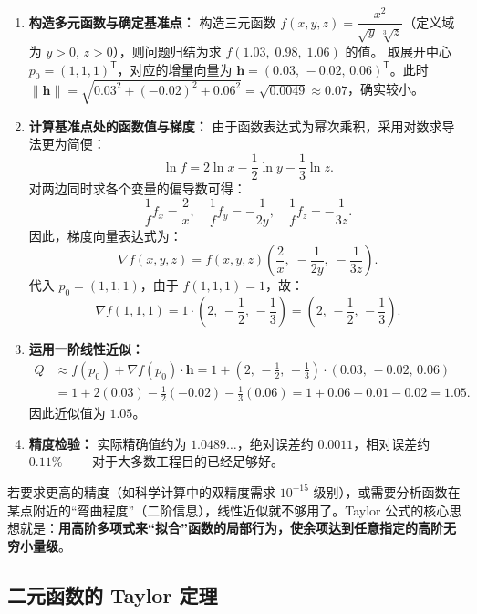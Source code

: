 \documentclass[lang=cn,11pt]{elegantbook}
\begin{document}
\begin{solution}
\begin{enumerate}
  \item \textbf{构造多元函数与确定基准点：}
  构造三元函数 $f(x,y,z)=\dfrac{x^2}{\sqrt{y}\,\sqrt[3]{z}}$（定义域为 $y>0$, $z>0$），则问题归结为求 $f(1.03,\;0.98,\;1.06)$ 的值。
  取展开中心 $p_0=(1,1,1)^{\mathsf T}$，对应的增量向量为 $\boldsymbol h=(0.03,\,-0.02,\,0.06)^{\mathsf T}$。此时 $\|\boldsymbol h\|=\sqrt{0.03^2+(-0.02)^2+0.06^2}=\sqrt{0.0049}\approx 0.07$，确实较小。

  \item \textbf{计算基准点处的函数值与梯度：}
  由于函数表达式为幂次乘积，采用对数求导法更为简便：
  \[
  \ln f = 2\ln x - \frac{1}{2}\ln y - \frac{1}{3}\ln z.
  \]
  对两边同时求各个变量的偏导数可得：
  \[
  \frac{1}{f}f_x = \frac{2}{x}, \quad \frac{1}{f}f_y = -\frac{1}{2y}, \quad \frac{1}{f}f_z = -\frac{1}{3z}.
  \]
  因此，梯度向量表达式为：
  \[
  \nabla f(x,y,z) = f(x,y,z) \left( \frac{2}{x},\; -\frac{1}{2y},\; -\frac{1}{3z} \right).
  \]
  代入 $p_0=(1,1,1)$，由于 $f(1,1,1)=1$，故：
  \[
  \nabla f(1,1,1) = 1 \cdot \left(2,\,-\frac{1}{2},\,-\frac{1}{3}\right) = \left(2,\,-\frac{1}{2},\,-\frac{1}{3}\right).
  \]

  \item \textbf{运用一阶线性近似：}
  \begin{align*}
  Q &\approx f(p_0) + \nabla f(p_0)\cdot\boldsymbol h = 1 + \left(2,\,-\frac{1}{2},\,-\frac{1}{3}\right) \cdot (0.03,\,-0.02,\,0.06) \\
  &= 1 + 2(0.03) - \frac{1}{2}(-0.02) - \frac{1}{3}(0.06) = 1 + 0.06 + 0.01 - 0.02 = 1.05.
  \end{align*}
  因此近似值为 $\boxed{1.05}$。
  
  \item \textbf{精度检验：} 实际精确值约为 $1.0489\dots$，绝对误差约 $0.0011$，相对误差约 $0.11\%$ ——对于大多数工程目的已经足够好。
\end{enumerate}
\end{solution}

\begin{note}[何时需要高阶项？]
若要求更高的精度（如科学计算中的双精度需求 $10^{-15}$ 级别），或需要分析函数在某点附近的“弯曲程度”（二阶信息），线性近似就不够用了。Taylor 公式的核心思想就是：\textbf{用高阶多项式来“拟合”函数的局部行为，使余项达到任意指定的高阶无穷小量级}。
\end{note}


\subsection{二元函数的 Taylor 定理}
\end{document}
